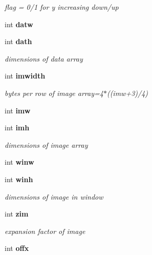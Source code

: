\begin{CompactItemize}
\begin{CompactList}\small\item\em flag = 0/1 for y increasing down/up \item\end{CompactList}\item 
int {\bf datw}\label{xtvutils_8c_a79}

\item 
int {\bf dath}\label{xtvutils_8c_a80}

\begin{CompactList}\small\item\em dimensions of data array \item\end{CompactList}\item 
int {\bf imwidth}\label{xtvutils_8c_a81}

\begin{CompactList}\small\item\em bytes per row of image array=4$\ast$((imw+3)/4) \item\end{CompactList}\item 
int {\bf imw}\label{xtvutils_8c_a82}

\item 
int {\bf imh}\label{xtvutils_8c_a83}

\begin{CompactList}\small\item\em dimensions of image array \item\end{CompactList}\item 
int {\bf winw}\label{xtvutils_8c_a84}

\item 
int {\bf winh}\label{xtvutils_8c_a85}

\begin{CompactList}\small\item\em dimensions of image in window \item\end{CompactList}\item 
int {\bf zim}\label{xtvutils_8c_a86}

\begin{CompactList}\small\item\em expansion factor of image \item\end{CompactList}\item 
int {\bf offx}\label{xtvutils_8c_a87}


\end{CompactItemize}
